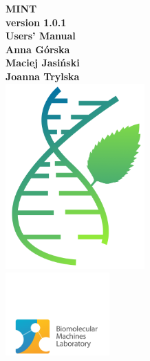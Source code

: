 \documentclass[12pt]{article}
\begin{document}
\begin{titlepage}
\centering
{{\Huge\bf \sffamily MINT}}\\
\vspace{0.35cm}
{{\Huge\bf \sffamily version 1.0.1}}\\
\vspace{0.5cm}
{{\Huge\bf \sffamily Users' Manual}}\\
\vspace{1cm}
{\large{\bf{\sffamily Anna G\'{o}rska}}}\\
{\large{\bf{\sffamily Maciej Jasi\'{n}ski}}}\\
{\large{\bf{\sffamily Joanna Trylska}}}\\
\vspace{2cm}
\includegraphics[width=0.4\textwidth]{./pictures/Mint.png}\\
\vspace{0.2cm}
\includegraphics[width=0.3\textwidth]{./pictures/logoLMB.png}
\end{titlepage}
\newpage
\end{document}
